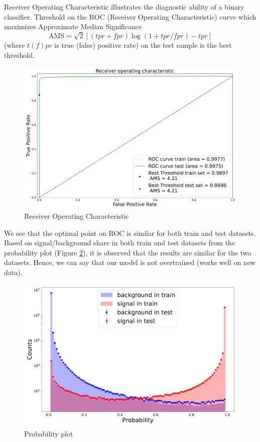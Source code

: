 Receiver Operating Characteristic illustrates the diagnostic ability of a binary classifier. Threshold on the ROC (Receiver Operating Characteristic) curve which maximizes Approximate Median Significance 
\begin{equation}
    \text{AMS}= \sqrt{2} [(tpr + fpr) \log(1 + tpr/fpr) - tpr]
\end{equation}
(where $t(f)pr$ is true (false) positive rate) on the test sample is the best threshold.
\begin{figure}[H]
    \centering
    \includegraphics[width=.98\textwidth]{img/ams.pdf}
    \caption{Receiver Operating Characteristic}
    \label{ROC}
\end{figure}
We see that the optimal point on ROC is similar for both train and test datasets.
Based on signal/background share in both train and test datasets from the probability plot (Figure \ref{Probability plot}), it is observed that the results are similar for the two datasets. Hence, we can say that our model is not overtrained (works well on new data).
\begin{figure}[H]
    \centering
    \includegraphics[width=.8\textwidth]{img/probability.pdf}
    \caption{Probability plot}
    \label{Probability plot}
\end{figure}

